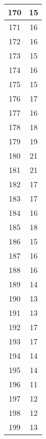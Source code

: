 \documentclass[letterpaper, 12pt]{article}
\begin{document}
\begin{longtable}{|c|c|}
\hline
170 & 15 \\
\hline
171 & 16 \\
\hline
172 & 16 \\
\hline
173 & 15 \\
\hline
174 & 16 \\
\hline
175 & 15 \\
\hline
176 & 17 \\
\hline
177 & 16 \\
\hline
178 & 18 \\
\hline
179 & 19 \\
\hline
180 & 21 \\
\hline
181 & 21 \\
\hline
182 & 17 \\
\hline
183 & 17 \\
\hline
184 & 16 \\
\hline
185 & 18 \\
\hline
186 & 15 \\
\hline
187 & 16 \\
\hline
188 & 16 \\
\hline
189 & 14 \\
\hline
190 & 13 \\
\hline
191 & 13 \\
\hline
192 & 17 \\
\hline
193 & 17 \\
\hline
194 & 14 \\
\hline
195 & 14 \\
\hline
196 & 11 \\
\hline
197 & 12 \\
\hline
198 & 12 \\
\hline
199 & 13 \\
\hline
\end{longtable}
\end{document}
